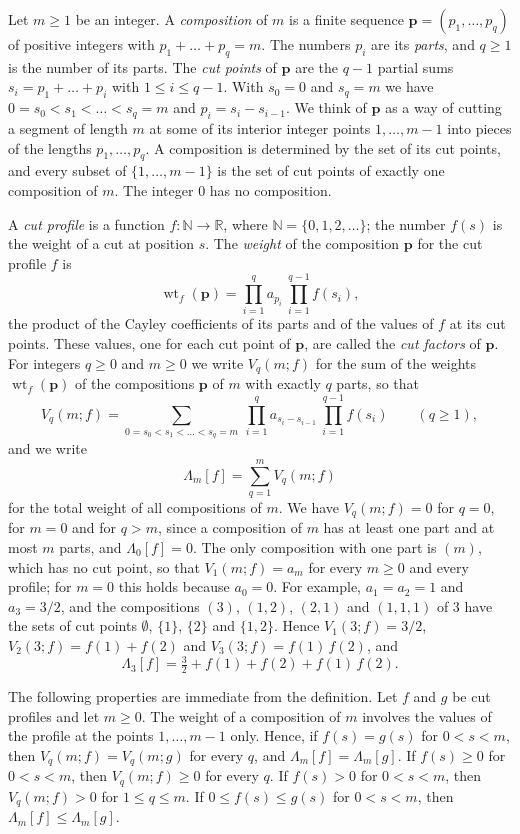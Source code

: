 \documentclass{amsart}
\theoremstyle{definition}
\theoremstyle{remark}
\numberwithin{equation}{section}
\begin{document}
Let $m\ge1$ be an integer. A \emph{composition} of $m$ is a finite sequence
$\mathbf p=(p_1,\dots,p_q)$ of positive integers with $p_1+\dots+p_q=m$. The numbers
$p_i$ are its \emph{parts}, and $q\ge1$ is the number of its parts. The
\emph{cut points} of $\mathbf p$ are the $q-1$ partial sums $s_i=p_1+\dots+p_i$ with
$1\le i\le q-1$. With $s_0=0$ and $s_q=m$ we have $0=s_0<s_1<\dots<s_q=m$ and
$p_i=s_i-s_{i-1}$. We think of $\mathbf p$ as a way of cutting a segment of length
$m$ at some of its interior integer points $1,\dots,m-1$ into pieces of the
lengths $p_1,\dots,p_q$. A composition is determined by the set of its cut
points, and every subset of $\{1,\dots,m-1\}$ is the set of cut points of
exactly one composition of $m$. The integer $0$ has no composition.

A \emph{cut profile} is a function $f\colon\mathbb N\to\mathbb R$, where
$\mathbb N=\{0,1,2,\dots\}$; the number $f(s)$ is the weight of a cut at
position $s$. The \emph{weight} of the composition $\mathbf p$ for the cut
profile
$f$ is
\[
\operatorname{wt}_f(\mathbf p)=\prod_{i=1}^{q}a_{p_i}\ \prod_{i=1}^{q-1}f(s_i),
\]
the product of the Cayley coefficients of its parts and of the values of $f$
at its cut points. These values, one for each cut point of $\mathbf p$, are
called the \emph{cut factors} of $\mathbf p$. For integers $q\ge0$ and
$m\ge0$ we write $V_q(m;f)$ for
the sum of the weights $\operatorname{wt}_f(\mathbf p)$ of the compositions $\mathbf p$ of
$m$ with exactly $q$ parts, so that
\[
V_q(m;f)=\sum_{0=s_0<s_1<\dots<s_q=m}\ \prod_{i=1}^{q}a_{s_i-s_{i-1}}\
\prod_{i=1}^{q-1}f(s_i)\qquad(q\ge1),
\]
and we write
\[
\Lambda_m[f]=\sum_{q=1}^{m}V_q(m;f)
\]
for the total weight of all compositions of $m$. We have
$V_q(m;f)=0$ for $q=0$, for $m=0$ and for $q>m$,
since a composition of $m$ has at least one part and at most $m$ parts, and
$\Lambda_0[f]=0$. The only composition with one part is $(m)$, which has no
cut point, so that $V_1(m;f)=a_m$ for every $m\ge0$ and every profile; for
$m=0$ this holds because $a_0=0$. For example, $a_1=a_2=1$ and $a_3=3/2$, and
the compositions $(3)$, $(1,2)$, $(2,1)$ and $(1,1,1)$ of $3$ have the sets of
cut points $\emptyset$, $\{1\}$, $\{2\}$ and $\{1,2\}$. Hence
$V_1(3;f)=3/2$, $V_2(3;f)=f(1)+f(2)$ and $V_3(3;f)=f(1)\,f(2)$, and
\[
\Lambda_3[f]=\tfrac32+f(1)+f(2)+f(1)\,f(2).
\]

The following properties are immediate from the definition. Let $f$ and $g$
be cut profiles and let $m\ge0$. The weight of a composition of $m$ involves
the values of the profile at the points $1,\dots,m-1$ only. Hence, if
$f(s)=g(s)$ for $0<s<m$, then $V_q(m;f)=V_q(m;g)$ for every $q$, and
$\Lambda_m[f]=\Lambda_m[g]$. If $f(s)\ge0$ for $0<s<m$, then
$V_q(m;f)\ge0$ for every $q$. If $f(s)>0$ for $0<s<m$, then $V_q(m;f)>0$
for $1\le q\le m$. If $0\le f(s)\le g(s)$ for $0<s<m$, then
$\Lambda_m[f]\le\Lambda_m[g]$.
\end{document}
